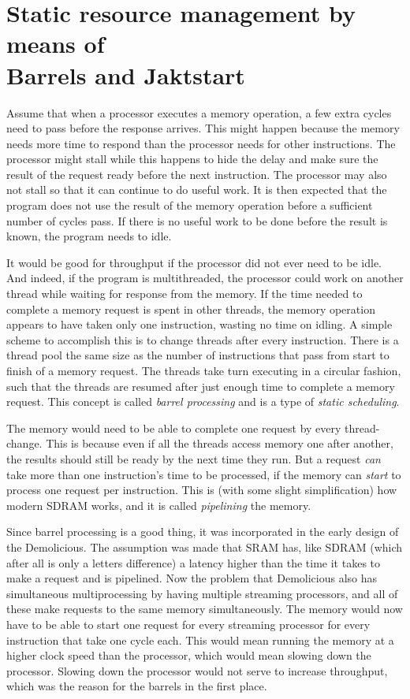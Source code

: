 \documentclass[../main/report.tex]{subfiles}
\begin{document}
\section{Static resource management by means of\\
Barrels and Jaktstart}

Assume that when a processor executes a memory operation, a few extra cycles need to pass before the response arrives.
This might happen because the memory needs more time to respond than the processor needs for other instructions.
The processor might stall while this happens to hide the delay and make sure the result of the request ready before the next instruction.
The processor may also not stall so that it can continue to do useful work.
It is then expected that the program does not use the result of the memory operation before a sufficient number of cycles pass.
If there is no useful work to be done before the result is known, the program needs to idle.

It would be good for throughput if the processor did not ever need to be idle.
And indeed, if the program is multithreaded, the processor could work on another thread while waiting for response from the memory.
If the time needed to complete a memory request is spent in other threads, the memory operation appears to have taken only one instruction, wasting no time on idling.
A simple scheme to accomplish this is to change threads after every instruction.
There is a thread pool the same size as the number of instructions that pass from start to finish of a memory request.
The threads take turn executing in a circular fashion, such that the threads are resumed after just enough time to complete a memory request.
This concept is called \emph{barrel processing} and is a type of \emph{static scheduling}.

The memory would need to be able to complete one request by every thread-change.
This is because even if all the threads access memory one after another, the results should still be ready by the next time they run.
But a request \emph{can} take more than one instruction's time to be processed, if the memory can \emph{start} to process one request per instruction.
This is (with some slight simplification) how modern SDRAM works, and it is called \emph{pipelining} the memory.

Since barrel processing is a good thing\texttrademark, it was incorporated in the early design of the Demolicious.
The assumption was made that SRAM has, like SDRAM (which after all is only a letters difference) a latency higher than the time it takes to make a request and is pipelined.
Now the problem that Demolicious also has simultaneous multiprocessing by having multiple streaming processors, and all of these make requests to the same memory simultaneously.
The memory would now have to be able to start one request for every streaming processor for every instruction that take one cycle each.
This would mean running the memory at a higher clock speed than the processor, which would mean slowing down the processor.
Slowing down the processor would not serve to increase throughput, which was the reason for the barrels in the first place.
\end{document}
